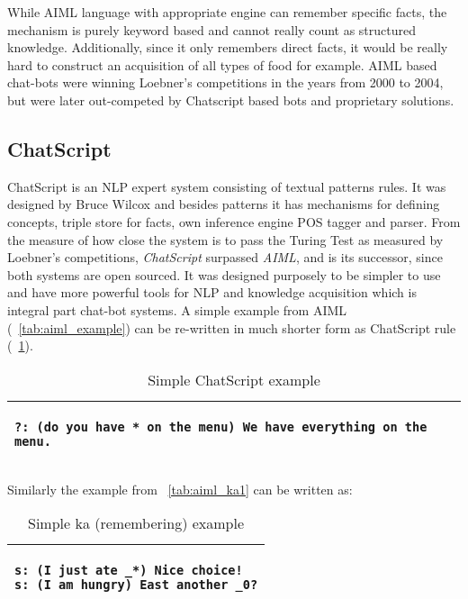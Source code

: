 While AIML language with appropriate engine can remember specific facts, the
mechanism is purely keyword based and cannot really count as structured knowledge. 
Additionally, since it only remembers direct facts, it would be
really hard to construct an acquisition of all types of food for example.
AIML based chat-bots were winning Loebner's competitions in the years from 2000
to 2004, but were later out-competed by Chatscript based bots and proprietary 
solutions.

\subsection {ChatScript}
\label{section:chatscript}
ChatScript is an NLP expert system consisting of textual patterns 
rules. It was designed by Bruce Wilcox \parencite{Wilcox2011} and besides
patterns it has mechanisms for defining concepts, triple store for facts, 
own inference engine POS tagger and parser. From the measure of how close 
the system is to pass the Turing Test as measured by Loebner's competitions, 
\emph{ChatScript} surpassed \emph{AIML},
and is its successor, since both systems are open sourced. It was designed 
purposely to be simpler to use and have more powerful tools for NLP and 
knowledge acquisition which is integral part chat-bot systems. A simple example
from AIML (\tablename~\ref{tab:aiml_example}) can be re-written in much 
shorter form as ChatScript rule (\tablename~\ref{tab:chatscript_example}).

\begin{table}[htb]
	\caption{Simple ChatScript example}
	\label{tab:chatscript_example}
	\centering
	\begin{tabular}{l}
		\hline
		\lstset{breaklines=true}
		\begin{lstlisting}
?: (do you have * on the menu) We have everything on the menu.
		\end{lstlisting}  \\
		\hline
	\end{tabular}
\end{table}

Similarly the example from \tablename~\ref{tab:aiml_ka1} can be written as:
\begin{table}[htb]
	\caption{Simple ka (remembering) example}
	\label{tab:chatscript_ka1}
	\centering
	\begin{tabular}{l}
		\hline
		\lstset{breaklines=true}
		\begin{lstlisting}
s: (I just ate _*) Nice choice!
s: (I am hungry) East another _0?
		\end{lstlisting}  \\
		\hline
	\end{tabular}
\end{table}

